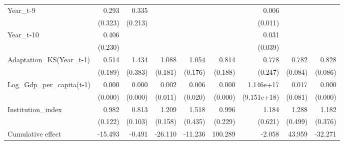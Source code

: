 \begin{table}[htbp]
\begin{tabular}{l*{8}{D{.}{.}{-1}}}
Year\_t-9            &       0.293         &       0.335\sym{*}  &                     &                     &                     &       0.006\sym{***}&                     &                     \\
                    &     (0.323)         &     (0.213)         &                     &                     &                     &     (0.011)         &                     &                     \\
Year\_t-10           &       0.406\sym{\%}  &                     &                     &                     &                     &       0.031\sym{***}&                     &                     \\
                    &     (0.230)         &                     &                     &                     &                     &     (0.039)         &                     &                     \\
Adaptation\_KS(Year\_t-1)&       0.514\sym{*}  &       1.434         &       1.088         &       1.054         &       0.814         &       0.778         &       0.782\sym{**} &       0.828\sym{*}  \\
                    &     (0.189)         &     (0.383)         &     (0.181)         &     (0.176)         &     (0.188)         &     (0.247)         &     (0.084)         &     (0.086)         \\
Log\_Gdp\_per\_capita(t-1)&       0.000         &       0.000\sym{**} &       0.002         &       0.006\sym{\%}  &       0.000\sym{***}&   1.146e+17         &       0.017         &       0.000         \\
                    &     (0.000)         &     (0.000)         &     (0.011)         &     (0.020)         &     (0.000)         & (9.151e+18)         &     (0.081)         &     (0.000)         \\
Institution\_index   &       0.982         &       0.813\sym{\%}  &       1.209\sym{\%}  &       1.518\sym{\%}  &       0.996         &       1.184         &       1.288         &       1.182         \\
                    &     (0.122)         &     (0.103)         &     (0.158)         &     (0.435)         &     (0.229)         &     (0.621)         &     (0.499)         &     (0.376)         \\
\midrule
Cumulative effect   &     -15.493         &      -0.491         &     -26.110         &     -11.236         &     100.289         &      -2.058         &      43.959         &     -32.271         \\

\end{tabular}
\end{table}
